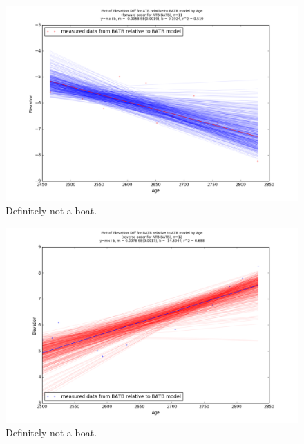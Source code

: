 \documentclass{article}
\begin{document}
\begin{figure}[h]
	\includegraphics[width=\linewidth]{data/gias/theGIA_ATB_relative_to_BATB.png}
	\caption{Definitely not a boat.}
	\label{fig:gias_ATBxBATB}
\end{figure}
\newpage


\begin{figure}[h]
	\includegraphics[width=\linewidth]{data/gias/theGIA_BATB_relative_to_ATB.png}
	\caption{Definitely not a boat.}
	\label{fig:gias_BATBxATB}
\end{figure}
\newpage
\end{document}
